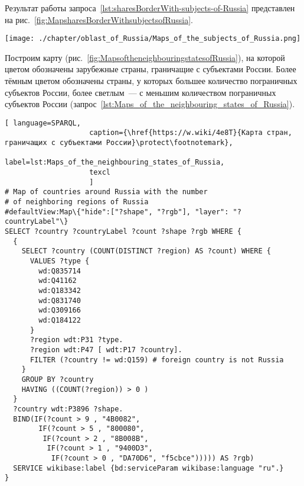 Результат работы запроса~\ref{lst:sharesBorderWith-subjects-of-Russia} 
представлен на рис.~\ref{fig:MapsharesBorderWithsubjectsofRussia}.

\begin{fullwidth}
\begin{figure*}[h]
	\texttt{[image: ./chapter/oblast\_of\_Russia/Maps\_of\_the\_subjects\_of\_Russia.png]}
	\caption[Карта пограничных субъектов России, 2021 год.]{Карта субъектов России, граничащих с зарубежными странами, 2021. Карта построена с помощью запроса~\protect\ref{lst:sharesBorderWith-subjects-of-Russia}.}%
      \label{fig:MapsharesBorderWithsubjectsofRussia}%
\end{figure*} 
\end{fullwidth}

Построим карту (рис.~\ref{fig:MapsoftheneighbouringstatesofRussia}), 
на которой цветом обозначены зарубежные страны, 
граничащие с субъектами России. 
Более тёмным цветом обозначены страны, у которых большее количество пограничных субъектов России, 
более светлым~--- с меньшим количеством пограничных субъектов России 
(запрос~\ref{lst:Maps_of_the_neighbouring_states_of_Russia}).

\lstset{numbers=left, firstnumber=1, frame=single}
\begin{lstlisting}[ language=SPARQL, 
                    caption={\href{https://w.wiki/4e8T}{Карта стран, граничащих с субъектами России}\protect\footnotemark},
                    label=lst:Maps_of_the_neighbouring_states_of_Russia,
                    texcl 
                    ]
# Map of countries around Russia with the number 
# of neighboring regions of Russia
#defaultView:Map\{"hide":["?shape", "?rgb"], "layer": "?countryLabel"\}
SELECT ?country ?countryLabel ?count ?shape ?rgb WHERE {
  {
    SELECT ?country (COUNT(DISTINCT ?region) AS ?count) WHERE {
      VALUES ?type {
        wd:Q835714
        wd:Q41162
        wd:Q183342
        wd:Q831740
        wd:Q309166
        wd:Q184122
      }
      ?region wdt:P31 ?type.
      ?region wdt:P47 [ wdt:P17 ?country].
      FILTER (?country != wd:Q159) # foreign country is not Russia
    }
    GROUP BY ?country
    HAVING ((COUNT(?region)) > 0 )
  }
  ?country wdt:P3896 ?shape.
  BIND(IF(?count > 9 , "4B0082", 
        IF(?count > 5 , "800080", 
         IF(?count > 2 , "8B008B", 
          IF(?count > 1 , "9400D3", 
           IF(?count > 0 , "DA70D6", "f5cbce"))))) AS ?rgb)
  SERVICE wikibase:label {bd:serviceParam wikibase:language "ru".}
}
\end{lstlisting}%


